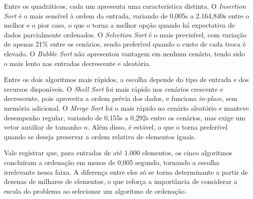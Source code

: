 \qquad Entre os quadráticos, cada um apresenta uma característica distinta. O \textit{Insertion Sort} é o mais sensível à ordem da entrada, variando de 0,005s a 2.164,840s entre o melhor e o pior caso, o que o torna a melhor opção quando há expectativa de dados parcialmente ordenados. O \textit{Selection Sort} é o mais previsível, com variação de apenas 21\% entre os cenários, sendo preferível quando o custo de cada troca é elevado. O \textit{Bubble Sort} não apresentou vantagem em nenhum cenário, tendo sido o mais lento nas entradas decrescente e aleatória.

\qquad Entre os dois algoritmos mais rápidos, a escolha depende do tipo de entrada e dos recursos disponíveis. O \textit{Shell Sort} foi mais rápido nos cenários crescente e decrescente, pois aproveita a ordem prévia dos dados, e funciona \textit{in-place}, sem memória adicional. O \textit{Merge Sort} foi o mais rápido no cenário aleatório e manteve desempenho regular, variando de 0,155s a 0,292s entre os cenários, mas exige um vetor auxiliar de tamanho $n$. Além disso, é estável, o que o torna preferível quando se deseja preservar a ordem relativa de elementos iguais.

\qquad Vale registrar que, para entradas de até 1.000 elementos, os cinco algoritmos concluíram a ordenação em menos de 0,005 segundo, tornando a escolha irrelevante nessa faixa. A diferença entre eles só se torna determinante a partir de dezenas de milhares de elementos, o que reforça a importância de considerar a escala do problema ao selecionar um algoritmo de ordenação.

\FloatBarrier